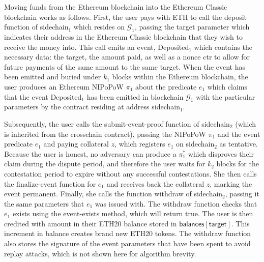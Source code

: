 Moving funds from the Ethereum blockchain into the Ethereum Classic blockchain
works as follows. First, the user pays with ETH to call the \textsf{deposit}
function of \textsf{sidechain}$_1$ which resides on $\mathcal{G}_1$, passing the
\textsf{target} parameter which indicates their address in the Ethereum Classic
blockchain that they wish to receive the money into. This call emits an event,
\textsf{Deposited}$_1$ which contains the necessary data: the \textsf{target},
the \textsf{amount} paid, as well as a nonce \textsf{ctr} to allow for future
payments of the same amount to the same target. When the event has been emitted
and buried under $k_1$ blocks within the Ethereum blockchain, the user produces
an Ethereum NIPoPoW $\pi_1$ about the predicate $e_1$ which claims that the
event \textsf{Deposited}$_1$ has been emitted in blockchain $\mathcal{G}_1$ with
the particular parameters by the contract residing at address
\textsf{sidechain}$_1$.

Subsequently, the user calls the \textsf{submit-event-proof} function of
\textsf{sidechain}$_2$ (which is inherited from the \textsf{crosschain}
contract), passing the NIPoPoW $\pi_1$ and the event predicate $e_1$ and paying
collateral $z$, which registers $e_1$ on \textsf{sidechain}$_2$ as tentative.
Because the user is honest, no adversary can produce a $\pi^*_1$
which disproves their claim during the dispute period, and therefore the user
waits for $k_2$ blocks for the contestation period to expire without any
successful contestations. She then calls the \textsf{finalize-event} function
for $e_1$ and receives back the collateral $z$, marking the event permanent.
Finally, she calls the function \textsf{withdraw} of \textsf{sidechain}$_2$,
passing it the same parameters that $e_1$ was issued with. The \textsf{withdraw}
function checks that $e_1$ exists using the \textsf{event-exists} method, which
will return \textsf{true}. The user is then credited with \textsf{amount} in
their ETH20 balance stored in $\textsf{balances}[\textsf{target}]$. This
increment in balance creates brand new ETH20 tokens. The \textsf{withdraw}
function also stores the signature of the event parameters that have been spent
to avoid replay attacks, which is not shown here for algorithm brevity.

